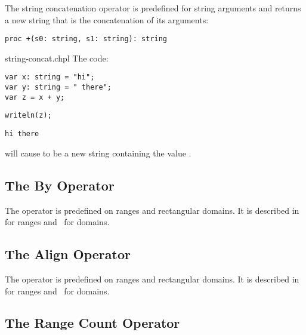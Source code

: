 The string concatenation operator \chpl{+} is predefined for string
arguments and returns a new string that is the concatenation of its
arguments:

\begin{chapel}
\begin{verbatim}
proc +(s0: string, s1: string): string 
\end{verbatim}
\end{chapel}

\begin{chapelexample}{string-concat.chpl}
The code:
\begin{chapel}
\begin{verbatim}
var x: string = "hi";
var y: string = " there";
var z = x + y;
\end{verbatim}
\end{chapel}
\begin{chapelnoprint}
\begin{verbatim}
writeln(z);
\end{verbatim}
\end{chapelnoprint}
\begin{chapeloutput}
\begin{verbatim}
hi there
\end{verbatim}
\end{chapeloutput}
will cause  to be a new string containing the value
.
\end{chapelexample}

\subsection{The By Operator}
\label{The_By_Operator}

The operator  is predefined on ranges and rectangular domains.
It is described in~ for ranges
and~ for domains.

\subsection{The Align Operator}
\label{The_Align_Operator}

The operator  is predefined on ranges and rectangular domains.
It is described in~ for ranges
and~ for domains.

\subsection{The Range Count Operator}
\label{The_Range_Count_Operator}

